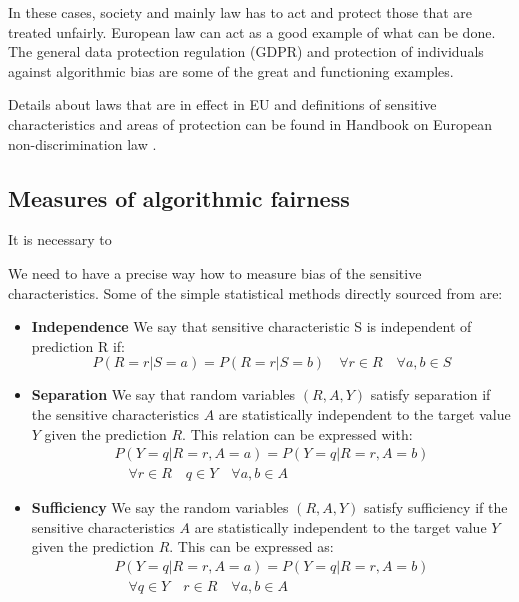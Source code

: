 In these cases, society and mainly law has to act and protect those that are treated unfairly. European law can act as a good example of what can be done. The general data protection regulation (GDPR) and protection of individuals against algorithmic bias are some of the great and functioning examples.

Details about laws that are in effect in EU and definitions of sensitive characteristics and areas of protection can be found in Handbook on European non-discrimination law \cite{european-union-agency-for-fundamental-rights-2018}.


\subsection{Measures of algorithmic fairness}
It is necessary to 

We need to have a precise way how to measure bias of the sensitive characteristics. Some of the simple statistical methods directly sourced from \cite{wikipedia-algo-fairness} are:
\begin{itemize}


    \item \textbf{Independence}
        We say that sensitive characteristic S is independent of prediction R if:
        \begin{equation}
            P\left(R = r|S = a\right)=P\left(R=r|S=b\right) \quad \forall r\in R \quad \forall a,b \in S
        \end{equation}
    
    
    \item \textbf{Separation}
        We say that random variables $(R,A,Y)$ satisfy separation if the sensitive characteristics $A$ are statistically independent to the target value $Y$ given the prediction $R$.
        This relation can be expressed with:
        \begin{equation}
        \begin{split}
            P\left(Y=q|R=r,A=a\right)=P\left(Y=q|R=r,A=b\right) \\
            \quad \forall r\in R\quad q \in Y \quad \forall a,b \in A
        \end{split}
        \end{equation}
    
    
    \item \textbf{Sufficiency}
        We say the random variables $(R,A,Y)$ satisfy sufficiency if the sensitive characteristics $A$ are statistically independent to the target value $Y$ given the prediction $R$. This can be expressed as:
        \begin{equation}
        \begin{split}
            P\left(Y=q|R=r,A=a\right)=P\left(Y=q|R=r,A=b\right) \\
            \quad \forall q\in Y\quad r \in R \quad \forall a,b \in A
        \end{split}
        \end{equation}
    
\end{itemize}


